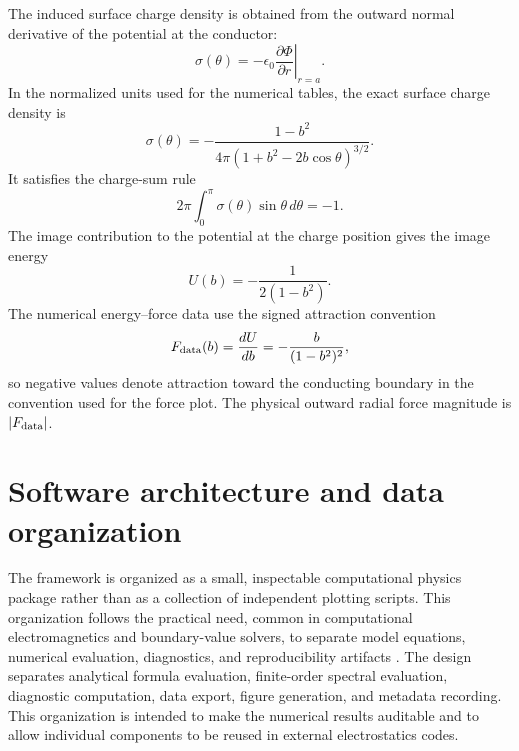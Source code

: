 \documentclass[preprint,12pt]{elsarticle}
\begin{document}
The induced surface charge density is obtained from the outward normal derivative of the potential at the conductor:
\begin{equation}
    \sigma(\theta)=-\epsilon_0\left.\frac{\partial\Phi}{\partial r}\right|_{r=a} .
\end{equation}
In the normalized units used for the numerical tables, the exact surface charge density is
\begin{equation}
\sigma(\theta)=-\frac{1-b^2}{4\pi\left(1+b^2-2b\cos\theta\right)^{3/2}} .
\label{eq:sigma_exact}
\end{equation}
It satisfies the charge-sum rule
\begin{equation}
    2\pi\int_0^\pi \sigma(\theta)\sin\theta\,d\theta=-1 .
\label{eq:charge_sum}
\end{equation}
The image contribution to the potential at the charge position gives the image energy
\begin{equation}
    U(b)=-\frac{1}{2(1-b^2)} .
\label{eq:energy}
\end{equation}
The numerical energy--force data use the signed attraction convention
\begin{equation}
    F_{\rm data}(b)=\frac{dU}{db}=-\frac{b}{(1-b^2)^2},
\label{eq:force}
\end{equation}
so negative values denote attraction toward the conducting boundary in the convention used for the force plot. The physical outward radial force magnitude is $|F_{\rm data}|$.


\section{Software architecture and data organization}\label{sec:architecture}

The framework is organized as a small, inspectable computational physics package rather than as a collection of independent plotting scripts. This organization follows the practical need, common in computational electromagnetics and boundary-value solvers, to separate model equations, numerical evaluation, diagnostics, and reproducibility artifacts \cite{cheng2005,pittino2014}. The design separates analytical formula evaluation, finite-order spectral evaluation, diagnostic computation, data export, figure generation, and metadata recording. This organization is intended to make the numerical results auditable and to allow individual components to be reused in external electrostatics codes.
\end{document}
